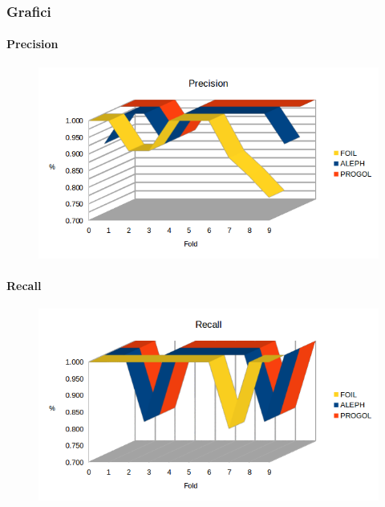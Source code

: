 \subsubsection{Grafici}
\paragraph{Precision}
\begin{figure}[hbtp]
	\includegraphics[width=1.2\textwidth]{img/datasetGraph/jmlr/precision.png}
	\label{JMLR-Precision}
\end{figure}
\paragraph{Recall}
\begin{figure}[hbtp]
	\includegraphics[width=1.2\textwidth]{img/datasetGraph/jmlr/recall.png}
	\label{JMLR-Recall}
\end{figure}
